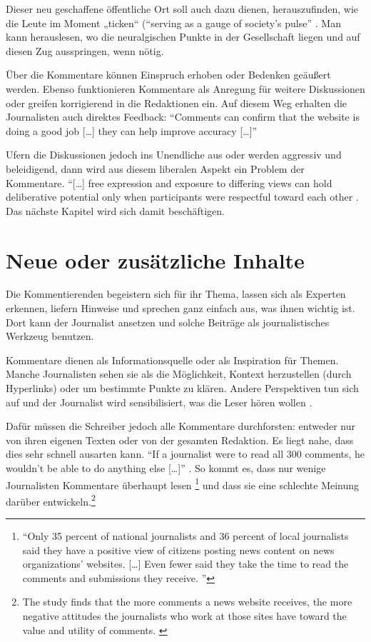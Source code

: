 Dieser neu geschaffene öffentliche Ort soll auch dazu dienen, herauszufinden,
wie die Leute im Moment „ticken“ (``serving as a gauge of society’s pulse''
\autocite[S.~181]{loke}. Man kann herauslesen, wo die neuralgischen Punkte in
der Gesellschaft liegen und auf diesen Zug ausspringen, wenn nötig.

Über die Kommentare können Einspruch erhoben oder Bedenken geäußert werden.
Ebenso funktionieren Kommentare als Anregung für weitere Diskussionen oder
greifen korrigierend  in die Redaktionen ein. Auf diesem Weg erhalten die
Journalisten auch direktes Feedback: ``Comments can confirm that the website is
doing a good job [\ldots] they can help improve accuracy [\ldots]''
\autocite[S.~105]{reich}

Ufern die Diskussionen jedoch ins Unendliche aus oder werden aggressiv und
beleidigend, dann wird aus diesem liberalen Aspekt ein Problem der Kommentare.
``[\ldots] free expression and exposure to differing views can hold deliberative
potential only when participants were respectful toward each other
\autocite[S.~7]{santana:2011}. Das nächste Kapitel wird sich damit beschäftigen.


\section{Neue oder zusätzliche Inhalte}

Die Kommentierenden begeistern sich für ihr Thema, lassen sich als Experten
erkennen, liefern Hinweise und sprechen ganz einfach aus, was ihnen wichtig ist.
Dort kann der Journalist ansetzen und solche Beiträge als \glqq journalistisches
Werkzeug\grqq{} \autocite[S.~133]{robinson} benutzen.

Kommentare dienen als Informationsquelle oder als Inspiration für Themen.
Manche Journalisten sehen sie als die Möglichkeit, Kontext herzustellen (durch
Hyperlinks) oder um bestimmte Punkte zu klären. Andere Perspektiven tun sich
auf und der Journalist wird sensibilisiert, was die Leser hören wollen
\autocite[S.~12]{santana:2014}.

Dafür müssen die Schreiber jedoch alle Kommentare durchforsten: entweder nur von
ihren eigenen Texten oder von der gesamten Redaktion. Es liegt nahe, dass dies
sehr schnell ausarten kann. ``If a journalist were to read all 300 comments, he
wouldn’t be able to do anything else [\ldots]'' \autocite[S.~84]{domingo}.  So
kommt es, dass nur wenige Journalisten Kommentare überhaupt lesen
\footnote{``Only 35 percent of national journalists and 36 percent of local
  journalists said they have a positive view of citizens posting news content on
  news organizations' websites.  [\ldots] Even fewer said they take the time to
  read the comments and submissions they receive. \autocite[S.
216]{meyer-carey}''}
und dass sie eine schlechte Meinung darüber entwickeln.\footnote{The study finds
  that the more comments a news website receives, the more negative attitudes
  the journalists who work at those sites have toward the value and utility of
  comments. \autocite[S.~214]{meyer-carey}}


